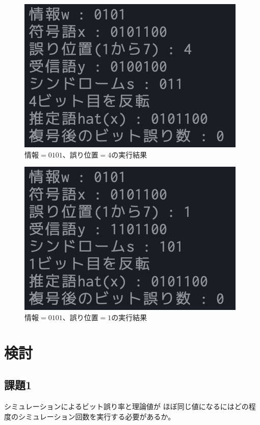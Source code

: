 \documentclass[12pt]{jarticle}
\begin{document}
\begin{figure}[h]
    \begin{center}
        \includegraphics[scale=0.8]{kadai3_2_1.png}
    \end{center}
    \caption{$情報=0101$、$誤り位置=4$の実行結果}
\end{figure}
\clearpage
\begin{figure}[h]
    \begin{center}
        \includegraphics[scale=0.8]{kadai3_2_2.png}
    \end{center}
    \caption{$情報=0101$、$誤り位置=1$の実行結果}
\end{figure}

\section{検討}
\subsection{課題1}
\begin{shadebox}
    シミュレーションによるビット誤り率と理論値が
    ほぼ同じ値になるにはどの程度のシミュレーション回数を実行する必要があるか。
\end{shadebox}
\end{document}
